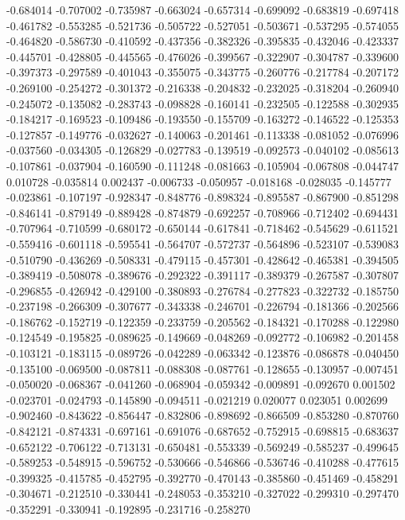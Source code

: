 -0.684014
-0.707002
-0.735987
-0.663024
-0.657314
-0.699092
-0.683819
-0.697418
-0.461782
-0.553285
-0.521736
-0.505722
-0.527051
-0.503671
-0.537295
-0.574055
-0.464820
-0.586730
-0.410592
-0.437356
-0.382326
-0.395835
-0.432046
-0.423337
-0.445701
-0.428805
-0.445565
-0.476026
-0.399567
-0.322907
-0.304787
-0.339600
-0.397373
-0.297589
-0.401043
-0.355075
-0.343775
-0.260776
-0.217784
-0.207172
-0.269100
-0.254272
-0.301372
-0.216338
-0.204832
-0.232025
-0.318204
-0.260940
-0.245072
-0.135082
-0.283743
-0.098828
-0.160141
-0.232505
-0.122588
-0.302935
-0.184217
-0.169523
-0.109486
-0.193550
-0.155709
-0.163272
-0.146522
-0.125353
-0.127857
-0.149776
-0.032627
-0.140063
-0.201461
-0.113338
-0.081052
-0.076996
-0.037560
-0.034305
-0.126829
-0.027783
-0.139519
-0.092573
-0.040102
-0.085613
-0.107861
-0.037904
-0.160590
-0.111248
-0.081663
-0.105904
-0.067808
-0.044747
0.010728
-0.035814
0.002437
-0.006733
-0.050957
-0.018168
-0.028035
-0.145777
-0.023861
-0.107197
-0.928347
-0.848776
-0.898324
-0.895587
-0.867900
-0.851298
-0.846141
-0.879149
-0.889428
-0.874879
-0.692257
-0.708966
-0.712402
-0.694431
-0.707964
-0.710599
-0.680172
-0.650144
-0.617841
-0.718462
-0.545629
-0.611521
-0.559416
-0.601118
-0.595541
-0.564707
-0.572737
-0.564896
-0.523107
-0.539083
-0.510790
-0.436269
-0.508331
-0.479115
-0.457301
-0.428642
-0.465381
-0.394505
-0.389419
-0.508078
-0.389676
-0.292322
-0.391117
-0.389379
-0.267587
-0.307807
-0.296855
-0.426942
-0.429100
-0.380893
-0.276784
-0.277823
-0.322732
-0.185750
-0.237198
-0.266309
-0.307677
-0.343338
-0.246701
-0.226794
-0.181366
-0.202566
-0.186762
-0.152719
-0.122359
-0.233759
-0.205562
-0.184321
-0.170288
-0.122980
-0.124549
-0.195825
-0.089625
-0.149669
-0.048269
-0.092772
-0.106982
-0.201458
-0.103121
-0.183115
-0.089726
-0.042289
-0.063342
-0.123876
-0.086878
-0.040450
-0.135100
-0.069500
-0.087811
-0.088308
-0.087761
-0.128655
-0.130957
-0.007451
-0.050020
-0.068367
-0.041260
-0.068904
-0.059342
-0.009891
-0.092670
0.001502
-0.023701
-0.024793
-0.145890
-0.094511
-0.021219
0.020077
0.023051
0.002699
-0.902460
-0.843622
-0.856447
-0.832806
-0.898692
-0.866509
-0.853280
-0.870760
-0.842121
-0.874331
-0.697161
-0.691076
-0.687652
-0.752915
-0.698815
-0.683637
-0.652122
-0.706122
-0.713131
-0.650481
-0.553339
-0.569249
-0.585237
-0.499645
-0.589253
-0.548915
-0.596752
-0.530666
-0.546866
-0.536746
-0.410288
-0.477615
-0.399325
-0.415785
-0.452795
-0.392770
-0.470143
-0.385860
-0.451469
-0.458291
-0.304671
-0.212510
-0.330441
-0.248053
-0.353210
-0.327022
-0.299310
-0.297470
-0.352291
-0.330941
-0.192895
-0.231716
-0.258270
